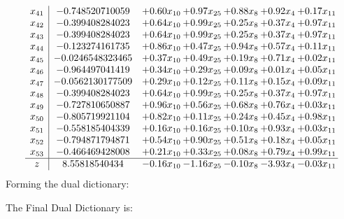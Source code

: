 \documentclass[8pt]{article}
\begin{document}
\[\begin{array}{c| c c@{\hskip 2pt} c@{\hskip 2pt} c@{\hskip 2pt} c@{\hskip 2pt} c@{\hskip 2pt} }
 x_{41}   &  -0.748520710059 & +  0.60 x_{10} & +  0.97 x_{25} & +  0.88 x_{8} & +  0.92 x_{4} & +  0.17 x_{11}\\
 x_{42}   &  -0.399408284023 & +  0.64 x_{10} & +  0.99 x_{25} & +  0.25 x_{8} & +  0.37 x_{4} & +  0.97 x_{11}\\
 x_{43}   &  -0.399408284023 & +  0.64 x_{10} & +  0.99 x_{25} & +  0.25 x_{8} & +  0.37 x_{4} & +  0.97 x_{11}\\
 x_{44}   &  -0.123274161735 & +  0.86 x_{10} & +  0.47 x_{25} & +  0.94 x_{8} & +  0.57 x_{4} & +  0.11 x_{11}\\
 x_{45}   &  -0.0246548323465 & +  0.37 x_{10} & +  0.49 x_{25} & +  0.19 x_{8} & +  0.71 x_{4} & +  0.02 x_{11}\\
 x_{46}   &  -0.964497041419 & +  0.34 x_{10} & +  0.29 x_{25} & +  0.09 x_{8} & +  0.01 x_{4} & +  0.05 x_{11}\\
 x_{47}   &  -0.0562130177509 & +  0.29 x_{10} & +  0.12 x_{25} & +  0.11 x_{8} & +  0.15 x_{4} & +  0.09 x_{11}\\
 x_{48}   &  -0.399408284023 & +  0.64 x_{10} & +  0.99 x_{25} & +  0.25 x_{8} & +  0.37 x_{4} & +  0.97 x_{11}\\
 x_{49}   &  -0.727810650887 & +  0.96 x_{10} & +  0.56 x_{25} & +  0.68 x_{8} & +  0.76 x_{4} & +  0.03 x_{11}\\
 x_{50}   &  -0.805719921104 & +  0.82 x_{10} & +  0.11 x_{25} & +  0.24 x_{8} & +  0.45 x_{4} & +  0.98 x_{11}\\
 x_{51}   &  -0.558185404339 & +  0.16 x_{10} & +  0.16 x_{25} & +  0.10 x_{8} & +  0.93 x_{4} & +  0.03 x_{11}\\
 x_{52}   &  -0.794871794871 & +  0.54 x_{10} & +  0.90 x_{25} & +  0.51 x_{8} & +  0.18 x_{4} & +  0.05 x_{11}\\
 x_{53}   &  -0.466469428008 & +  0.21 x_{10} & +  0.33 x_{25} & +  0.08 x_{8} & +  0.79 x_{4} & +  0.99 x_{11}\\
\hline
z    &  8.55818540434 & -0.16 x_{10} & -1.16 x_{25} & -0.10 x_{8} & -3.93 x_{4} & -0.03 x_{11}\\
\end{array}\]
Forming the dual dictionary:

The Final Dual Dictionary is: 
\end{document}
